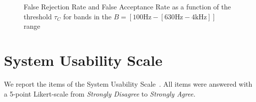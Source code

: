 \begin{figure}[!ht]
%
%
%
\caption[{FRR and FAR as a function of the threshold $\tau_C$ for bands in the $B=[100\text{Hz}-[630\text{Hz}-4\text{kHz}]]$ range}]{False Rejection Rate and False Acceptance Rate as a function of the threshold $\tau_C$ for bands in the $B=[100\text{Hz}-[630\text{Hz}-4\text{kHz}]]$ range}
\end{figure}

\section{System Usability Scale}
\label{app:ps_sp_sus}
We report the items of the System Usability Scale~\cite{sus}.
All items were answered with a 5-point Likert-scale from \emph{Strongly Disagree} to \emph{Strongly Agree.}

